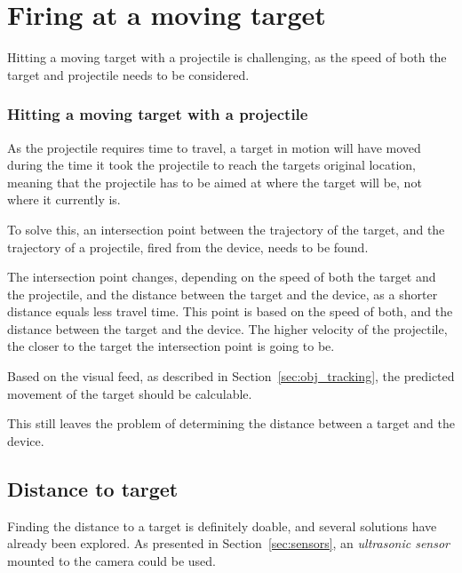 \section{Firing at a moving target}
Hitting a moving target with a projectile is challenging, as the speed of both the target and projectile needs to be considered.

\subsubsection{Hitting a moving target with a projectile}
As the projectile requires time to travel, a target in motion will have moved during the time it took the projectile to reach the targets original location, meaning that the projectile has to be aimed at where the target will be, not where it currently is.

To solve this, an intersection point between the trajectory of the target, and the trajectory of a projectile, fired from the device, needs to be found.

The intersection point changes, depending on the speed of both the target and the projectile, and the distance between the target and the device, as a shorter distance equals less travel time.
This point is based on the speed of both, and the distance between the target and the device. 
The higher velocity of the projectile, the closer to the target the intersection point is going to be.

Based on the visual feed, as described in Section~\ref{sec:obj_tracking}, the predicted movement of the target should be calculable.


This still leaves the problem of determining the distance between a target and the device.
\subsection{Distance to target}
Finding the distance to a target is definitely doable, and several solutions have already been explored.
As presented in Section~\ref{sec:sensors}, an \textit{ultrasonic sensor} mounted to the camera could be used.

